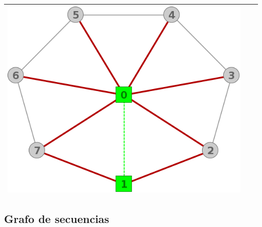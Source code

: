 \begin{center}
\begin{tabular}{ |c||c||c| }
			\includegraphics[scale = 0.25]{img/ej3/constructiva_golosa/Wheel_st2.png} \\
			\hline
		\end{tabular}
	\end{center}

\subsection{Grafo de secuencias}

